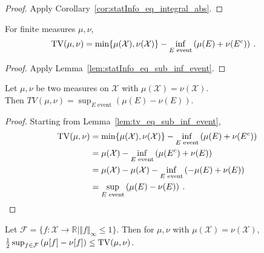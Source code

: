 \begin{proof}%
{}
Apply Corollary~\ref{cor:statInfo_eq_integral_abs}.
\end{proof}


\begin{lemma}
  \label{lem:tv_eq_sub_inf_event}
  For finite measures $\mu, \nu$,
  \begin{align*}
  \operatorname{TV}(\mu, \nu)
  &= \min\{\mu(\mathcal X), \nu(\mathcal X)\} - \inf_{E \text{ event}} \left( \mu(E) + \nu(E^c) \right)
  \: .
  \end{align*}
\end{lemma}

\begin{proof}%
{}
Apply Lemma~\ref{lem:statInfo_eq_sub_inf_event}.
\end{proof}


\begin{theorem}
  \label{thm:tv_eq_sup_sub_measure}
  \uses{}
  Let $\mu, \nu$ be two measures on $\mathcal X$ with $\mu(\mathcal X) = \nu(\mathcal X)$.\\
  Then $TV(\mu, \nu) = \sup_{E \text{ event}} \left( \mu(E) - \nu(E) \right)$.
\end{theorem}

\begin{proof}%
{}
Starting from Lemma~\ref{lem:tv_eq_sub_inf_event},
\begin{align*}
\operatorname{TV}(\mu, \nu)
&= \min\{\mu(\mathcal X), \nu(\mathcal X)\} - \inf_{E \text{ event}} \left( \mu(E) + \nu(E^c) \right)
\\
&= \mu(\mathcal X) - \inf_{E \text{ event}} \left( \mu(E^c) + \nu(E) \right)
\\
&= \mu(\mathcal X) - \mu(\mathcal X) - \inf_{E \text{ event}} \left( -\mu(E) + \nu(E) \right)
\\
&= \sup_{E \text{ event}} \left( \mu(E) - \nu(E) \right)
\: .
\end{align*}
\end{proof}


\begin{lemma}
  \label{lem:tv_eq_sup_aux}
  Let $\mathcal F = \{f : \mathcal X \to \mathbb{R} \mid \Vert f \Vert_\infty \le 1\}$.
  Then for $\mu, \nu $ with $\mu(\mathcal X) = \nu(\mathcal X)$, $\frac{1}{2} \sup_{f \in \mathcal F} \left( \mu[f] - \nu[f] \right) \le \operatorname{TV}(\mu, \nu)$.
\end{lemma}

